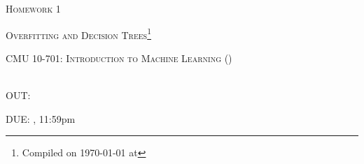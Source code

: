 \documentclass{article}
\begin{document}
\section*{}
\begin{center}
  \centerline{\textsc{\LARGE  Homework 1}}
  \vspace{0.5em}
  \centerline{\textsc{\LARGE Overfitting and Decision Trees}\footnote{Compiled on \today{} at \currenttime{}}}
  \vspace{1em}
  \textsc{\large CMU 10-701: Introduction to Machine Learning (\currentsemester)} \\
  \vspace{0.5em}
  \currentpiazza \\
  \vspace{0.5em}
  \centerline{OUT: \hwOneRelease}
  \vspace{0.5em}
  \centerline{DUE: \hwOneDue, 11:59pm}
\end{center}
\end{document}
